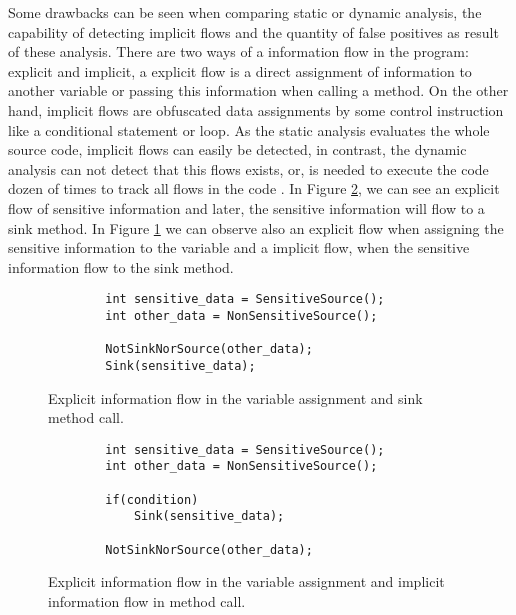 Some drawbacks can be seen when comparing static or dynamic analysis, the capability of detecting implicit flows and the quantity of false positives as result of these analysis. There are two ways of a information flow in the program: explicit and implicit, a explicit flow is a direct assignment of information to another variable or passing this information when calling a method. On the other hand, implicit flows are obfuscated data assignments by some control instruction like a conditional statement or loop. As the static analysis evaluates the whole source code, implicit flows can easily be detected, in contrast, the dynamic analysis can not detect that this flows exists, or, is needed to execute the code dozen of times to track all flows in the code \citep{russo2010dynamic}. In Figure \ref{figure:explicit}, we can see an explicit flow of sensitive information and later, the sensitive information will flow to a sink method. In Figure \ref{figure:implicit} we can observe also an explicit flow when assigning the sensitive information to the variable and a implicit flow, when the sensitive information flow to the sink method.

\begin{figure}[ht] 
    \centering
    \begin{lstlisting}
        int sensitive_data = SensitiveSource();
        int other_data = NonSensitiveSource();

        NotSinkNorSource(other_data);
        Sink(sensitive_data);
    \end{lstlisting}
    \caption{Explicit information flow in the variable assignment and sink method call.}
    \label{figure:implicit}
    \vspace{4ex}
\end{figure}

\begin{figure}[ht]
    \centering
    \begin{lstlisting}
        int sensitive_data = SensitiveSource();
        int other_data = NonSensitiveSource();

        if(condition)
            Sink(sensitive_data);

        NotSinkNorSource(other_data);
    \end{lstlisting}
    \caption{Explicit information flow in the variable assignment and implicit information flow in method call.}
    \label{figure:explicit}
    \vspace{4ex}
\end{figure}

